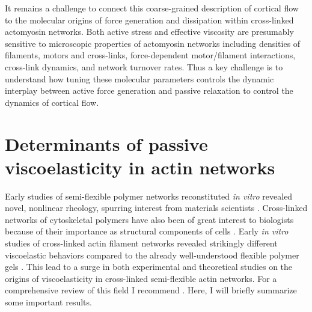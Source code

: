 It remains a challenge to connect this coarse-grained description of cortical flow to the molecular origins of force generation and dissipation within cross-linked actomyosin networks.  Both active stress and effective viscosity are presumably sensitive to microscopic properties of actomyosin networks including densities of filaments, motors and cross-links, force-dependent motor/filament interactions, cross-link dynamics, and network turnover rates.  Thus a key challenge is to understand how tuning these molecular parameters controls the dynamic interplay between active force generation and passive relaxation to control the dynamics of cortical flow.


\section{Determinants of passive viscoelasticity in actin networks}


Early studies of semi-flexible polymer networks reconstituted {\em in vitro} revealed novel, nonlinear rheology, spurring interest from materials scientists \cite{megareview}.  Cross-linked networks of cytoskeletal polymers have also been of great interest to biologists because of their importance as structural components of cells \cite{cellmech_review1,cellmech_review2}.  Early {\em in vitro}  studies of cross-linked actin filament networks revealed strikingly different viscoelastic behaviors compared to the already well-understood flexible polymer gels \cite{rheo_bench}. This lead to a surge in both experimental and theoretical studies on the origins of viscoelasticity in cross-linked semi-flexible actin networks. For a comprehensive review of this field I recommend \cite{megareview}. Here, I will briefly summarize some important results.



